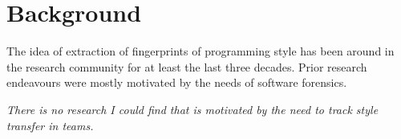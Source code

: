 \section{Background}
The idea of extraction of fingerprints of programming style has been around in the research community for at least the last three decades. 
Prior research endeavours were mostly motivated by the needs of software forensics.

\textit{There is no research I could find that is motivated by the need to track style transfer in teams.}